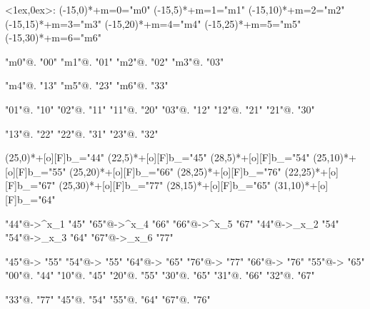 \documentclass{article}
\newenvironment{network}%
    {\begin{xy}<1ex,0ex>:}%
    {\end{xy}}
\def\nnNode[#1](#2)#3{\POS(#2)*#3="#1"}
\def\nnLink[#1,#2]#3{\POS"#1"\ar #3 "#2"}
\begin{document}
\begin{center}
\begin{network}
            \nnNode[m0](-15,0)  {+{\scriptstyle m=0}}
            \nnNode[m1](-15,5)  {+{\scriptstyle m=1}}
            \nnNode[m2](-15,10) {+{\scriptstyle m=2}}
            \nnNode[m3](-15,15) {+{\scriptstyle m=3}}
				\nnNode[m4](-15,20)  {+{\scriptstyle m=4}}
            \nnNode[m5](-15,25)  {+{\scriptstyle m=5}}
            \nnNode[m6](-15,30) {+{\scriptstyle m=6}}

            \nnLink[m0,00] {@{.}}
            \nnLink[m1,01] {@{.}}
            \nnLink[m2,02] {@{.}}
            \nnLink[m3,03] {@{.}}

				\nnLink[m4,13] {@{.}}
            \nnLink[m5,23] {@{.}}
            \nnLink[m6,33] {@{.}}

            \nnLink[01,10] {@{.}}
            \nnLink[02,11] {@{.}}
            \nnLink[11,20] {@{.}}
            \nnLink[03,12] {@{.}}
            \nnLink[12,21] {@{.}}
            \nnLink[21,30] {@{.}}

				\nnLink[13,22] {@{.}}
            \nnLink[22,31] {@{.}}
            \nnLink[23,32] {@{.}}



				\nnNode[44](25,0)      {+[o][F]{b_{}}}
            \nnNode[45](22,5)     {+[o][F]{b_{}}}
            \nnNode[54](28,5)      {+[o][F]{b_{}}}
            \nnNode[55](25,10)     {+[o][F]{b_{}}}
            \nnNode[66](25,20)     {+[o][F]{b_{}}}
            \nnNode[76](28,25)    {+[o][F]{b_{}}}
            \nnNode[67](22,25)     {+[o][F]{b_{}}}
            \nnNode[77](25,30)     {+[o][F]{b_{}}}
				 \nnNode[65](28,15)     {+[o][F]{b_{}}}
					\nnNode[64](31,10)     {+[o][F]{b_{}}}

				\nnLink[44,45] {@{->}^{x_1}}
            \nnLink[65,66] {@{->}^{x_4}}
            \nnLink[66,67] {@{->}^{x_5}}
            \nnLink[44,54] {@{->}_{x_2}}
            \nnLink[54,64] {@{->}_{x_3}}
            \nnLink[67,77] {@{->}_{x_6}}
				
				\nnLink[45,55] {@{->}}
            \nnLink[54,55] {@{->}}
            \nnLink[64,65] {@{->}}
            \nnLink[76,77] {@{->}}
            \nnLink[66,76] {@{->}}
				\nnLink[55,65] {@{->}}
				\nnLink[00,44] {@{.}}
            \nnLink[10,45] {@{.}}
            \nnLink[20,55] {@{.}}
            \nnLink[30,65] {@{.}}
            \nnLink[31,66] {@{.}}
            \nnLink[32,67] {@{.}}

				\nnLink[33,77] {@{.}}
            \nnLink[45,54] {@{.}}
            \nnLink[55,64] {@{.}}
				\nnLink[67,76] {@{.}}
        \end{network}
    \end{center}

\begin{thebibliography}{27}

\end{thebibliography}
\end{document}
